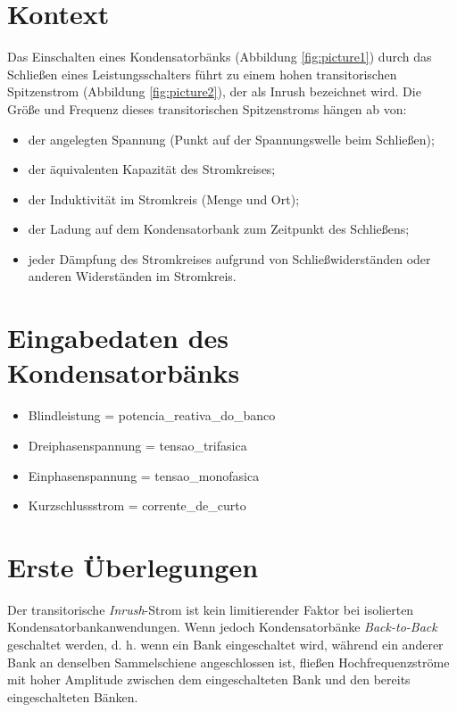 \documentclass[a4paper]{article}
\begin{document}

\section{Kontext}
Das Einschalten eines Kondensatorbänks (Abbildung \ref{fig:picture1}) durch das Schließen eines Leistungsschalters führt zu einem hohen transitorischen Spitzenstrom (Abbildung \ref{fig:picture2}), der als Inrush bezeichnet wird. Die Größe und Frequenz dieses transitorischen Spitzenstroms hängen ab von:
\begin{itemize}[label=\textendash]
\item der angelegten Spannung (Punkt auf der Spannungswelle beim Schließen);
\item der äquivalenten Kapazität des Stromkreises;
\item der Induktivität im Stromkreis (Menge und Ort);
\item der Ladung auf dem Kondensatorbank zum Zeitpunkt des Schließens;
\item jeder Dämpfung des Stromkreises aufgrund von Schließwiderständen oder anderen Widerständen im Stromkreis.
\end{itemize}

\section{Eingabedaten des Kondensatorbänks}
\begin{itemize}[label=\textendash]
	\item Blindleistung  = {{potencia_reativa_do_banco}}
	\item Dreiphasenspannung  = {{tensao_trifasica}}
	\item Einphasenspannung  = {{tensao_monofasica}}
	\item Kurzschlussstrom  = {{corrente_de_curto}}
\end{itemize}

\begin{center}
\end{center}

\section{Erste Überlegungen}

Der transitorische \textit{Inrush}-Strom ist kein limitierender Faktor bei isolierten Kondensatorbankanwendungen. Wenn jedoch Kondensatorbänke \textit{Back-to-Back} geschaltet werden, d. h. wenn ein Bank eingeschaltet wird, während ein anderer Bank an denselben Sammelschiene angeschlossen ist, fließen Hochfrequenzströme mit hoher Amplitude zwischen dem eingeschalteten Bank und den bereits eingeschalteten Bänken.
\end{document}
